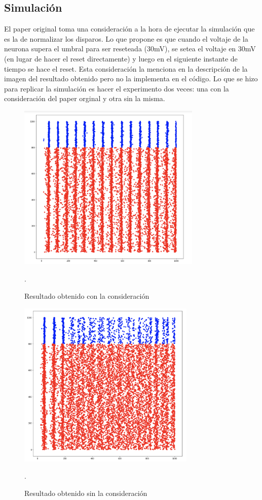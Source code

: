\documentclass[12pt]{article}
\begin{document}
\subsection{Simulación}
El paper original toma una consideración a la hora de ejecutar la simulación que es la de normalizar los disparos. Lo que propone es que cuando el voltaje de la neurona supera el umbral para ser reseteada (30mV), se setea el voltaje en 30mV (en lugar de hacer el reset directamente) y luego en el siguiente instante de tiempo se hace el reset. Esta consideración la menciona en la descripción de la imagen del resultado obtenido pero no la implementa en el código.
Lo que se hizo para replicar la simulación es hacer el experimento dos veces: una con la consideración del paper orginal y otra sin la misma.

\begin{figure}[h!]
    \centering
        \includegraphics[height=8cm]{images/resultadoConNorm.png}
    \caption[fontsize=2pt]{Resultado obtenido con la consideración}.
\end{figure}

\begin{figure}[h!]
    \centering
        \includegraphics[height=8cm]{images/resultadoSinNorm.png}
    \caption[fontsize=2pt]{Resultado obtenido sin la consideración}.
\end{figure}
\end{document}
